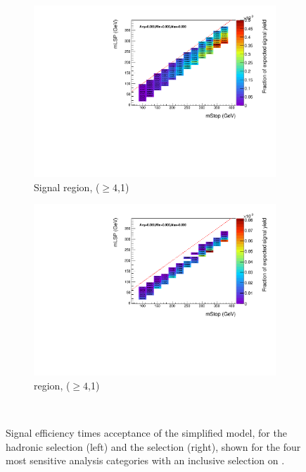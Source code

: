 \begin{figure}[p]
\begin{subfigure}[b]{0.47\textwidth}
    \includegraphics[width=\textwidth]{Figs/sms/t2degen/v23/effs/T2_4body_had_eff_maps_eq1b_ge4j_SITV.pdf}
    \caption{Signal region, ($\geq 4$,1)}
    \label{fig:t2_4body_sig_eff_ge4j_1b}
  \end{subfigure}
  \begin{subfigure}[b]{0.47\textwidth}
    \includegraphics[width=\textwidth]{Figs/sms/t2degen/v23/effs/T2_4body_muon_eff_maps_eq1b_ge4j_SITV.pdf}
    \caption{\mj region, ($\geq 4$,1)}
    \label{fig:t2_4body_mu_eff_ge4j_1b}
  \end{subfigure} \\
  \caption{Signal efficiency times acceptance of the \Ttwodegen simplified
  model, for
  the hadronic selection (left) and the \mj selection (right), shown for the 
  four most sensitive analysis categories with an inclusive selection on \HT.}
  \label{fig:t2_4body_eff}
\end{figure}

